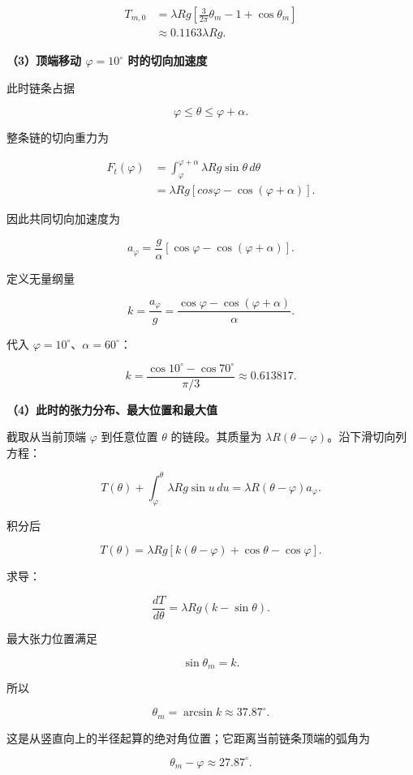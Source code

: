 \documentclass[12pt,a4paper,UTF8]{ctexart}
\begin{document}
\[
\begin{aligned}
T_{m,0}
&=\lambda Rg\left[
\frac{3}{2\pi}\theta_m-1+\cos\theta_m
\right]\\
&\approx0.1163\lambda Rg.
\end{aligned}
\tag{8}
\]

\textbf{（3）顶端移动 \(\varphi=10^\circ\) 时的切向加速度}

此时链条占据

\[
\varphi\leq\theta\leq\varphi+\alpha.
\]

整条链的切向重力为

\[
\begin{aligned}
F_t(\varphi)
&=\int_\varphi^{\varphi+\alpha}
\lambda Rg\sin\theta\,d\theta\\
&=\lambda Rg[cos\varphi-\cos(\varphi+\alpha)].
\end{aligned}
\]

因此共同切向加速度为

\[
a_\varphi
=\frac{g}{\alpha}
[\cos\varphi-\cos(\varphi+\alpha)].
\tag{9}
\]

定义无量纲量

\[
k=\frac{a_\varphi}{g}
=\frac{\cos\varphi-\cos(\varphi+\alpha)}{\alpha}.
\tag{10}
\]

代入 \(\varphi=10^\circ\)、\(\alpha=60^\circ\)：

\[
k
=\frac{\cos10^\circ-\cos70^\circ}{\pi/3}
\approx0.613817.
\tag{11}
\]

\textbf{（4）此时的张力分布、最大位置和最大值}

截取从当前顶端 \(\varphi\) 到任意位置 \(\theta\) 的链段。其质量为
\(\lambda R(\theta-\varphi)\)。沿下滑切向列方程：

\[
T(\theta)
+\int_\varphi^\theta\lambda Rg\sin u\,du
=\lambda R(\theta-\varphi)a_\varphi.
\]

积分后

\[
\boxed{
T(\theta)=\lambda Rg
\left[k(\theta-\varphi)+\cos\theta-\cos\varphi\right]
}.
\tag{12}
\]

求导：

\[
\frac{dT}{d\theta}=\lambda Rg(k-\sin\theta).
\]

最大张力位置满足

\[
\sin\theta_m=k.
\]

所以

\[
\boxed{
\theta_m=\arcsin k
\approx37.87^\circ
}.
\tag{13}
\]

这是从竖直向上的半径起算的绝对角位置；它距离当前链条顶端的弧角为

\[
\theta_m-\varphi\approx27.87^\circ.
\]
\end{document}
